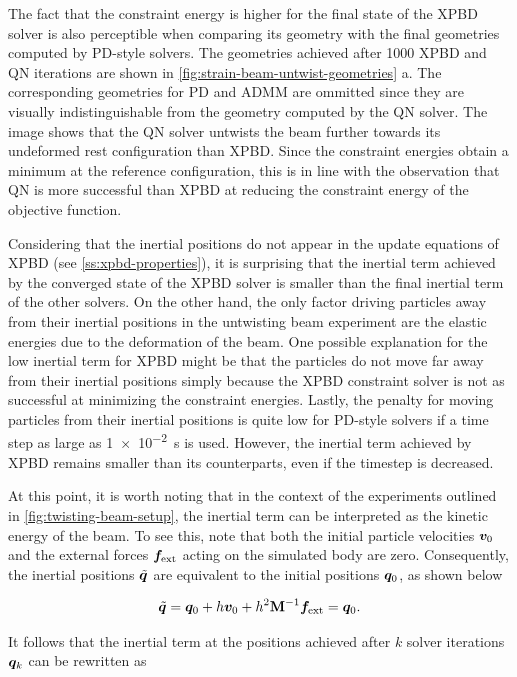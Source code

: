 The fact that the constraint energy is higher for the final state of the XPBD solver is also perceptible when comparing its geometry with the final geometries computed 
by PD-style solvers. The geometries achieved after 1000 XPBD and QN iterations are shown in \autoref{fig:strain-beam-untwist-geometries} a. 
The corresponding geometries for PD and ADMM are ommitted since they are visually indistinguishable from the geometry computed by the QN solver. The image shows 
that the QN solver untwists the beam further towards its undeformed rest configuration than XPBD. Since the constraint energies obtain a minimum at the reference 
configuration, this is in line with the observation that QN is more successful than XPBD at reducing the constraint energy of the objective function.

Considering that the inertial positions do not appear in the update equations of XPBD (see \cref{ss:xpbd-properties}), it is surprising that the inertial term achieved 
by the converged state of the XPBD solver is smaller than the final inertial term of the other solvers. On the other hand, the only factor driving particles away from 
their inertial positions in the untwisting beam experiment are the elastic energies due to the deformation of the beam. One possible explanation for the low inertial 
term for XPBD might be that the particles do not move far away from their inertial positions simply because the XPBD constraint solver is not as successful at 
minimizing the constraint energies. Lastly, the penalty for moving particles from their inertial positions is quite low for PD-style solvers if a time step as large 
as \SI{1e-2}{\second} is used. However, the inertial term achieved by XPBD remains smaller than its counterparts, even if the timestep is decreased.

At this point, it is worth noting that in the context of the experiments outlined in \autoref{fig:twisting-beam-setup}, the inertial term can be interpreted as the 
kinetic energy of the beam. To see this, note that both the initial particle velocities 
$\bm{v}_0$ and the external forces $\bm{f}_{\text{ext}}$ acting on the simulated body are zero. Consequently, the inertial positions $\tilde{\bm{q}}$ are 
equivalent to the initial positions $\bm{q}_0$, as shown below

\[ 
    \tilde{\bm{q}} = \bm{q}_0 + h\bm{v}_0 + h^2\mathbf{M}^{-1}\bm{f}_{\text{ext}} = \bm{q}_0.
\]

\noindent It follows that the inertial term at the positions achieved after $k$ solver iterations $\bm{q}_k$ can be rewritten as

